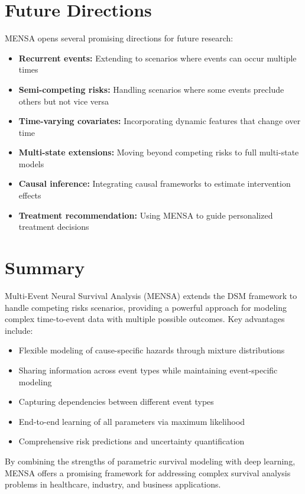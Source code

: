 \section{Future Directions}

MENSA opens several promising directions for future research:

\begin{itemize}
    \item \textbf{Recurrent events:} Extending to scenarios where events can occur multiple times
    \item \textbf{Semi-competing risks:} Handling scenarios where some events preclude others but not vice versa
    \item \textbf{Time-varying covariates:} Incorporating dynamic features that change over time
    \item \textbf{Multi-state extensions:} Moving beyond competing risks to full multi-state models
    \item \textbf{Causal inference:} Integrating causal frameworks to estimate intervention effects
    \item \textbf{Treatment recommendation:} Using MENSA to guide personalized treatment decisions
\end{itemize}

\section{Summary}

Multi-Event Neural Survival Analysis (MENSA) extends the DSM framework to handle competing risks scenarios, providing a powerful approach for modeling complex time-to-event data with multiple possible outcomes. Key advantages include:

\begin{itemize}
    \item Flexible modeling of cause-specific hazards through mixture distributions
    \item Sharing information across event types while maintaining event-specific modeling
    \item Capturing dependencies between different event types
    \item End-to-end learning of all parameters via maximum likelihood
    \item Comprehensive risk predictions and uncertainty quantification
\end{itemize}

By combining the strengths of parametric survival modeling with deep learning, MENSA offers a promising framework for addressing complex survival analysis problems in healthcare, industry, and business applications.